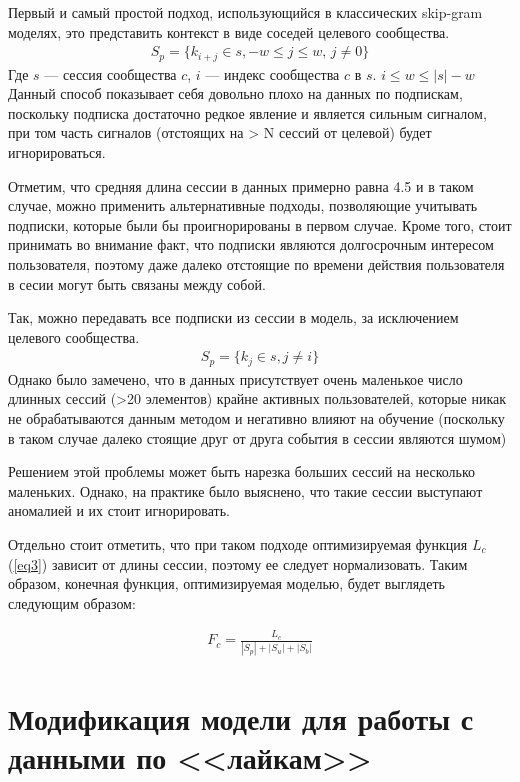 \documentclass[times,specification,annotation]{itmo-student-thesis}
\begin{document}
Первый и самый простой подход, использующийся в классических skip-gram моделях, это представить контекст в виде соседей целевого сообщества. 
\begin{align}
S_p =\{k_{i + j} \in s, -w \leq j \leq w,\, j \ne 0\} \label{eq4}
\end{align}
Где $s$ --- сессия сообщества $c$, $i$ --- индекс сообщества $c$ в $s$. $i \leq w \leq |s| - w$
Данный
способ показывает себя довольно плохо на данных по подпискам, поскольку подписка
достаточно редкое явление и является сильным сигналом, при том часть сигналов
(отстоящих на > N сессий от целевой) будет игнорироваться.

Отметим, что средняя длина сессии в данных примерно равна 4.5 и в таком случае, можно применить альтернативные подходы, позволяющие учитывать подписки, которые были бы проигнорированы в первом случае. Кроме того, стоит принимать во внимание факт, что подписки являются долгосрочным интересом пользователя, поэтому даже далеко отстоящие по времени действия пользователя в сесии могут быть связаны между собой.

Так, можно передавать все подписки из сессии в модель, за исключением целевого сообщества.
\begin{align}
S_p =\{k_j \in s, j \ne i\} \label{eq5}
\end{align}
Однако было замечено, что в данных присутствует очень маленькое число длинных сессий (>20 элементов) крайне активных пользователей, которые никак не обрабатываются данным методом и негативно
влияют на обучение (поскольку в таком случае далеко стоящие друг от друга
события в сессии являются шумом)

Решением этой проблемы может быть нарезка больших
сессий на несколько маленьких. Однако, на практике было выяснено, что такие сессии выступают аномалией и их стоит игнорировать. 

Отдельно стоит отметить, что при таком подходе оптимизируемая функция $L_c$ (\ref{eq3}) зависит от длины сессии, поэтому ее следует нормализовать. Таким образом, конечная функция, оптимизируемая моделью, будет выглядеть следующим образом: 

\begin{align}
F_c = \frac{L_c}{|S_p| + |S_u| + |S_b|} \label{eq6}
\end{align}

\section{Модификация модели для работы с данными по <<лайкам>>}\label{sec:datal}
\end{document}
